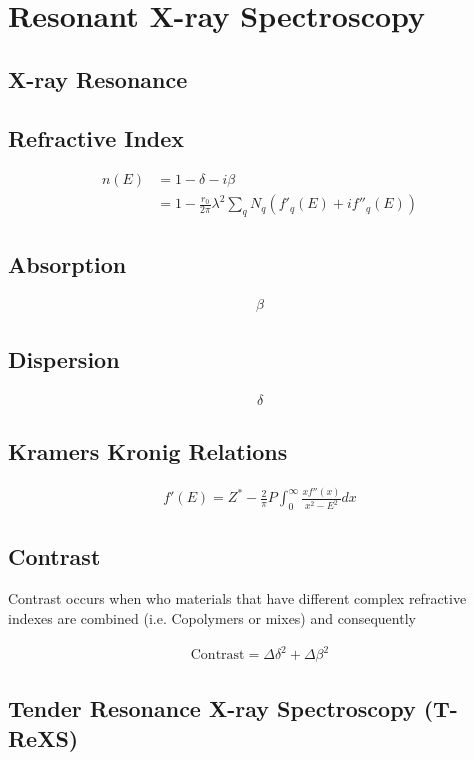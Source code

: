 \documentclass[../main.tex]{subfiles}
\begin{document}
	\chapter{Resonant X-ray Spectroscopy}\label{chap:06-res-spec}
		\section{X-ray Resonance}
		
		\section{Refractive Index}
		
		\begin{align}
			n(E) &= 1 - \delta - i\beta\\
			&= 1 - \frac{r_0}{2\pi}\lambda^2\sum_q N_q (f'_q(E) + if''_q(E))
		\end{align}
		
		\section{Absorption}
		\begin{align}
			\beta
		\end{align}
		\section{Dispersion}
		\begin{align}
			\delta
		\end{align}
		\section{Kramers Kronig Relations}
		\begin{align}
			f'(E) = Z^* - \frac{2}{\pi}P\int_{0}^{\infty}\frac{x f''(x)}{x^2 - E^2}dx
		\end{align}
		
		
		\section{Contrast}
			Contrast occurs when who materials that have different complex refractive indexes are combined (i.e. Copolymers or mixes) and consequently 
			
			\begin{align}
				\text{Contrast} = \Delta \delta^2 + \Delta \beta^2
			\end{align}
		
		\section{Tender Resonance X-ray Spectroscopy (T-ReXS)}

\ifSubfilesClassLoaded{
	\printbibliography{}
	\printglossaries
}{} %
	
\end{document}
